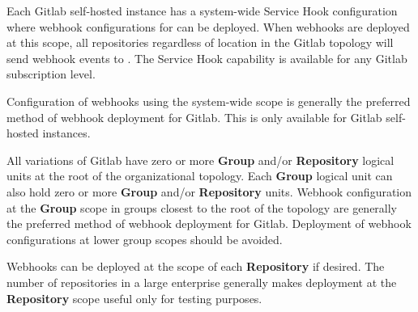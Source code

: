 Each Gitlab self-hosted instance has a system-wide Service Hook configuration where webhook
configurations for \cxoneflow can be deployed.  When webhooks are deployed at this scope, 
all repositories regardless of location in the Gitlab topology will send webhook events to \cxoneflowns.
The Service Hook capability is available for any Gitlab subscription level.

Configuration of webhooks using the system-wide scope is generally the preferred
method of webhook deployment for Gitlab.  This is only available for Gitlab self-hosted instances.

All variations of Gitlab have zero or more \textbf{Group} and/or \textbf{Repository} logical units
at the root of the organizational topology.  Each \textbf{Group} logical unit can also hold zero or more
\textbf{Group} and/or \textbf{Repository} units.  Webhook configuration at the \textbf{Group}
scope in groups closest to the root of the topology are generally the preferred
method of webhook deployment for Gitlab.  Deployment of webhook configurations at lower
group scopes should be avoided.

Webhooks can be deployed at the scope of each \textbf{Repository} if desired.  The number of repositories
in a large enterprise generally makes deployment at the \textbf{Repository} scope useful
only for testing purposes.

